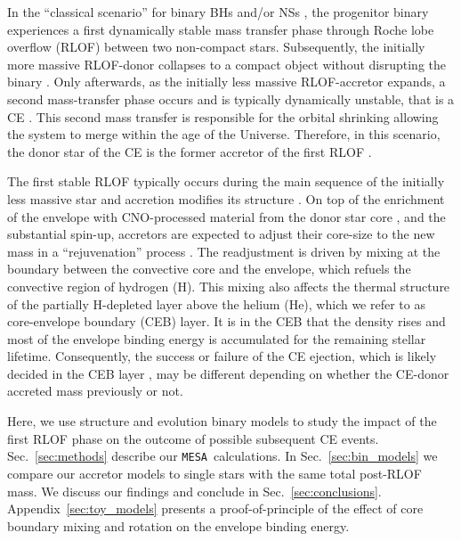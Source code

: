 \documentclass[twocolumn,twocolappendix,trackchanges]{aastex63}
\newcommand{\code}[1]{\texttt{#1}}
\newcommand{\mesa}{\code{MESA}}
\DeclareRobustCommand{\Secref}[1]{Sec.~\ref{#1}}
\begin{document}
In the ``classical scenario'' for binary BHs and/or NSs
\citep[e.g.,][]{tutukov:93,belczynski:2016, tauris:2017}, the
progenitor binary %
experiences a first dynamically stable mass transfer
phase through Roche lobe overflow (RLOF) between two non-compact
stars. Subsequently, the initially more massive RLOF-donor collapses to a
compact object without disrupting the binary
\citep[e.g.,][]{blaauw:1961,renzo:2019walk}. Only afterwards, as the
initially less massive RLOF-accretor expands, a second mass-transfer phase
occurs and is typically dynamically unstable, that is a CE
\citep[e.g.,][]{dominik:2012, belczynski:2016, kruckow:18}. This
second mass transfer is responsible for the orbital shrinking
\citep{paczynski:1976} allowing the system to merge within the age of
the Universe. Therefore, in this scenario, the donor star of the CE is
the former accretor of the first RLOF \citep[e.g.,][]{klencki:2020,
  law-smith:2020, renzo:2021zoph}.

The first stable RLOF typically occurs during the main sequence of the
initially less massive star and accretion modifies its structure
\citep[e.g.,][]{neo:1977, packet:1981, blaauw:1993, cantiello:2007,
  renzo:2021zoph}. On top of the enrichment of the envelope with
CNO-processed material from the donor star core \citep{blaauw:1993,
  renzo:2021zoph, el-badry:2022a}, and the substantial spin-up,
accretors are expected to adjust their core-size to the new mass in a
``rejuvenation'' process \citep[e.g.,][]{neo:1977, hellings:1983,
  hellings:1984}. The readjustment is driven by mixing at the boundary
between the convective core and the envelope, which refuels the
convective region of hydrogen (H). This mixing also affects the
thermal structure of the partially H-depleted layer above the helium
(He), which we refer to as core-envelope boundary (CEB) layer. It is
in the CEB that the density rises and most of the envelope binding
energy is accumulated for the remaining stellar lifetime.
Consequently, the success or failure of the CE ejection, which is
likely decided in the CEB layer \citep[e.g.,][]{ivanova:2013}, may be
different depending on whether the CE-donor accreted mass previously
or not.

Here, we use structure and evolution binary models to study the impact
of the first RLOF phase on the outcome of possible subsequent CE
events. \Secref{sec:methods} describe our \mesa\ calculations. In
\Secref{sec:bin_models} we compare our accretor models to single stars
with the same total post-RLOF mass. We discuss our findings and
conclude in \Secref{sec:conclusions}. Appendix~\ref{sec:toy_models} presents a
proof-of-principle of the effect of core boundary mixing and rotation
on the envelope binding energy.
\end{document}
